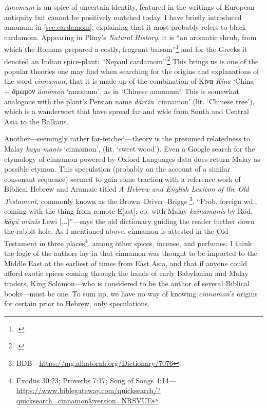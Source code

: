
\textit{Amomum} is an spice of uncertain identity, featured in the writings of European antiquity but cannot be positively matched today. I have briefly introduced amomum in \cref{sec:cardamom}, explaining that it most probably refers to black cardamom. Appearing in Pliny's \textit{Natural History}, it is ``an aromatic shrub, from which the Romans prepared a costly, fragrant balsam''\footcite[amomum ]{lewis_latin_1879} and for the Greeks it denoted an Indian spice-plant: ``Nepaul cardamom''.\footcite[ἄμωμον ]{liddell_greek-english_1940}
This brings us is one of the popular theories one may find when searching for the origins and explanations of the word \textit{cinnamon}, that it is made up of the combination of Κίνα \textit{Kína} `China' + ἄμωμον \textit{ámōmon} `amomum', as in `Chinese amomum'. This is somewhat analogous with the plant's Persian name \textit{dârčin} `cinnamon' (lit. `Chinese tree'), which is a \gls{wanderwort} that have spread far and wide from South and Central Asia to the Balkans. 

Another---seemingly rather far-fetched---theory is the presumed relatedness to Malay \textit{kayu manis} `cinnamon', (lit. `sweet wood'). Even a Google search for the etymology of cinnamon powered by Oxford Languages data does return Malay as possible etymon. This speculation (probably on the account of a similar consonant sequence) seemed to gain some traction with a reference work of Biblical Hebrew and Aramaic titled \textit{A Hebrew and English Lexicon of the Old Testament}, commonly known as the Brown–Driver–Briggs \parencite[see][890]{brown_hebrew_1939}\footnote{BDB---\url{https://mg.alhatorah.org/Dictionary/7076}}. ``Prob. foreign wd., coming with the thing from remote E[ast]; cp. with Malay \textit{kainamanis} by Röd, \textit{kāyü mānĭs} Lewi [...]''---says the old dictionary guiding the reader further down the rabbit hole. As I mentioned above, cinnamon is attested in the Old Testament in three places\footnote{Exodus 30:23; Proverbs 7:17; Song of Songs 4:14---\url{https://www.biblegateway.com/quicksearch/?quicksearch=cinnamon&version=NRSVUE}}, among other spices, incense, and perfumes. I think the logic of the authors lay in that cinnamon was thought to be imported to the Middle East at the earliest of times from East Asia, and that if anyone could afford exotic spices coming through the hands of early Babylonian and Malay traders, King Solomon---who is considered to be the author of several Biblical books---must be one. To sum up, we have no way of knowing \textit{cinnamon}'s origins for certain prior to Hebrew, only speculations.

